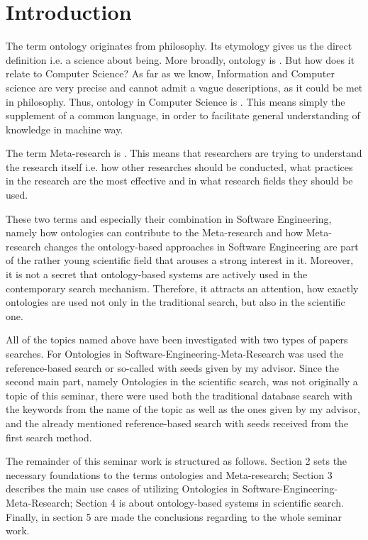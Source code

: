 
\section{Introduction}
\label{ch:Introduction}
The term ontology originates from philosophy. Its etymology gives us the direct definition i.e. a science about being. More broadly, ontology is \frqq\cite{OntPh}. But how does it relate to Computer Science? As far as we know, Information and Computer science are very precise and cannot admit a vague descriptions, as it could be met in philosophy. Thus, ontology in Computer Science is \frqq\cite{OntCS}. This means simply the supplement of a common language, in order to facilitate general understanding of knowledge in machine way. 

The term Meta-research is \frqq\cite{MR}. This means that researchers are trying to understand the research itself i.e. how other researches should be conducted, what practices in the research are the most effective and in what research fields they should be used. 

These two terms and especially their combination in Software Engineering, namely how ontologies can contribute to the Meta-research and how Meta-research changes the ontology-based approaches in Software Engineering are part of the rather young scientific field that arouses a strong interest in it. Moreover, it is not a secret that ontology-based systems are actively used in the contemporary search mechanism. Therefore, it attracts an attention, how exactly ontologies are used not only in the traditional search, but also in the scientific one.

All of the topics named above have been investigated with two types of papers searches. For Ontologies in Software-Engineering-Meta-Research was used the reference-based search or so-called \frqq\cite{Woh14} with seeds given by my advisor. Since the second main part, namely Ontologies in the scientific search, was not originally a topic of this seminar, there were used both the traditional database search with the keywords from the name of the topic as well as the ones given by my advisor, and the already mentioned reference-based search with seeds received from the first search method.

The remainder of this seminar work is structured as follows. Section 2 sets the necessary foundations to the terms ontologies and Meta-research; Section 3 describes the main use cases of utilizing Ontologies in Software-Engineering-Meta-Research; Section 4 is about ontology-based systems in scientific search. Finally, in section 5 are made the conclusions regarding to the whole seminar work.               